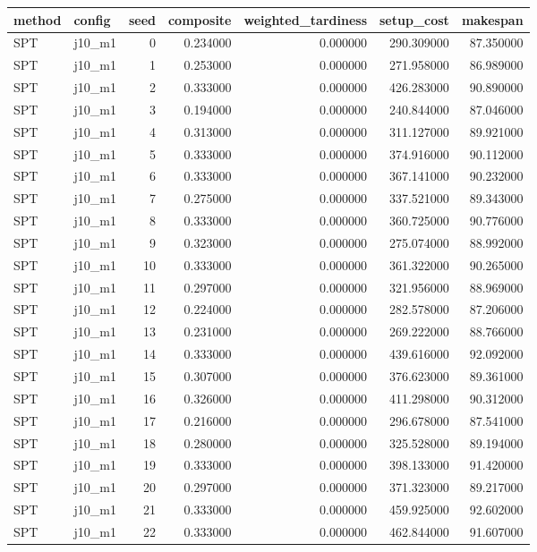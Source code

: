 \begin{tabular}{llrrrrr}
\toprule
method & config & seed & composite & weighted_tardiness & setup_cost & makespan \\
\midrule
SPT & j10_m1 & 0 & 0.234000 & 0.000000 & 290.309000 & 87.350000 \\
SPT & j10_m1 & 1 & 0.253000 & 0.000000 & 271.958000 & 86.989000 \\
SPT & j10_m1 & 2 & 0.333000 & 0.000000 & 426.283000 & 90.890000 \\
SPT & j10_m1 & 3 & 0.194000 & 0.000000 & 240.844000 & 87.046000 \\
SPT & j10_m1 & 4 & 0.313000 & 0.000000 & 311.127000 & 89.921000 \\
SPT & j10_m1 & 5 & 0.333000 & 0.000000 & 374.916000 & 90.112000 \\
SPT & j10_m1 & 6 & 0.333000 & 0.000000 & 367.141000 & 90.232000 \\
SPT & j10_m1 & 7 & 0.275000 & 0.000000 & 337.521000 & 89.343000 \\
SPT & j10_m1 & 8 & 0.333000 & 0.000000 & 360.725000 & 90.776000 \\
SPT & j10_m1 & 9 & 0.323000 & 0.000000 & 275.074000 & 88.992000 \\
SPT & j10_m1 & 10 & 0.333000 & 0.000000 & 361.322000 & 90.265000 \\
SPT & j10_m1 & 11 & 0.297000 & 0.000000 & 321.956000 & 88.969000 \\
SPT & j10_m1 & 12 & 0.224000 & 0.000000 & 282.578000 & 87.206000 \\
SPT & j10_m1 & 13 & 0.231000 & 0.000000 & 269.222000 & 88.766000 \\
SPT & j10_m1 & 14 & 0.333000 & 0.000000 & 439.616000 & 92.092000 \\
SPT & j10_m1 & 15 & 0.307000 & 0.000000 & 376.623000 & 89.361000 \\
SPT & j10_m1 & 16 & 0.326000 & 0.000000 & 411.298000 & 90.312000 \\
SPT & j10_m1 & 17 & 0.216000 & 0.000000 & 296.678000 & 87.541000 \\
SPT & j10_m1 & 18 & 0.280000 & 0.000000 & 325.528000 & 89.194000 \\
SPT & j10_m1 & 19 & 0.333000 & 0.000000 & 398.133000 & 91.420000 \\
SPT & j10_m1 & 20 & 0.297000 & 0.000000 & 371.323000 & 89.217000 \\
SPT & j10_m1 & 21 & 0.333000 & 0.000000 & 459.925000 & 92.602000 \\
SPT & j10_m1 & 22 & 0.333000 & 0.000000 & 462.844000 & 91.607000 \\

\end{tabular}

